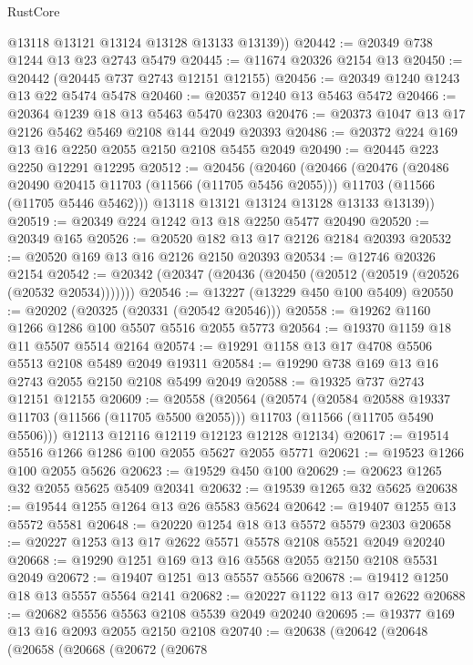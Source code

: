 \begin{lexlean}{RustCore}
\begin{coremodule}
        @13118
        @13121
        @13124
        @13128
        @13133
        @13139))
@20442 := @20349 @738 @1244 @13 @23 @2743 @5479
@20445 := @11674 @20326 @2154 @13
@20450 := @20442 (@20445 @737 @2743 @12151 @12155)
@20456 := @20349 @1240 @1243 @13 @22 @5474 @5478
@20460 := @20357 @1240 @13 @5463 @5472
@20466 := @20364 @1239 @18 @13 @5463 @5470 @2303
@20476 := @20373 @1047 @13 @17 @2126 @5462 @5469 @2108 @144 @2049 @20393
@20486 := @20372 @224 @169 @13 @16 @2250 @2055 @2150 @2108 @5455 @2049
@20490 := @20445 @223 @2250 @12291 @12295
@20512 := @20456
    (@20460
      (@20466
        (@20476
          (@20486 @20490 @20415 @11703 (@11566 (@11705 @5456 @2055)))
          @11703
          (@11566 (@11705 @5446 @5462)))
        @13118
        @13121
        @13124
        @13128
        @13133
        @13139))
@20519 := @20349 @224 @1242 @13 @18 @2250 @5477 @20490
@20520 := @20349 @165
@20526 := @20520 @182 @13 @17 @2126 @2184 @20393
@20532 := @20520 @169 @13 @16 @2126 @2150 @20393
@20534 := @12746 @20326 @2154
@20542 := @20342 (@20347 (@20436 (@20450 (@20512 (@20519 (@20526 (@20532 @20534)))))))
@20546 := @13227 (@13229 @450 @100 @5409)
@20550 := @20202 (@20325 (@20331 (@20542 @20546)))
@20558 := @19262 @1160 @1266 @1286 @100 @5507 @5516 @2055 @5773
@20564 := @19370 @1159 @18 @11 @5507 @5514 @2164
@20574 := @19291 @1158 @13 @17 @4708 @5506 @5513 @2108 @5489 @2049 @19311
@20584 := @19290 @738 @169 @13 @16 @2743 @2055 @2150 @2108 @5499 @2049
@20588 := @19325 @737 @2743 @12151 @12155
@20609 := @20558
    (@20564
      (@20574
        (@20584 @20588 @19337 @11703 (@11566 (@11705 @5500 @2055)))
        @11703
        (@11566 (@11705 @5490 @5506)))
      @12113
      @12116
      @12119
      @12123
      @12128
      @12134)
@20617 := @19514 @5516 @1266 @1286 @100 @2055 @5627 @2055 @5771
@20621 := @19523 @1266 @100 @2055 @5626
@20623 := @19529 @450 @100
@20629 := @20623 @1265 @32 @2055 @5625 @5409 @20341
@20632 := @19539 @1265 @32 @5625
@20638 := @19544 @1255 @1264 @13 @26 @5583 @5624
@20642 := @19407 @1255 @13 @5572 @5581
@20648 := @20220 @1254 @18 @13 @5572 @5579 @2303
@20658 := @20227 @1253 @13 @17 @2622 @5571 @5578 @2108 @5521 @2049 @20240
@20668 := @19290 @1251 @169 @13 @16 @5568 @2055 @2150 @2108 @5531 @2049
@20672 := @19407 @1251 @13 @5557 @5566
@20678 := @19412 @1250 @18 @13 @5557 @5564 @2141
@20682 := @20227 @1122 @13 @17 @2622
@20688 := @20682 @5556 @5563 @2108 @5539 @2049 @20240
@20695 := @19377 @169 @13 @16 @2093 @2055 @2150 @2108
@20740 := @20638
    (@20642
      (@20648
        (@20658
          (@20668
            (@20672
              (@20678

\end{coremodule}
\end{lexlean}

